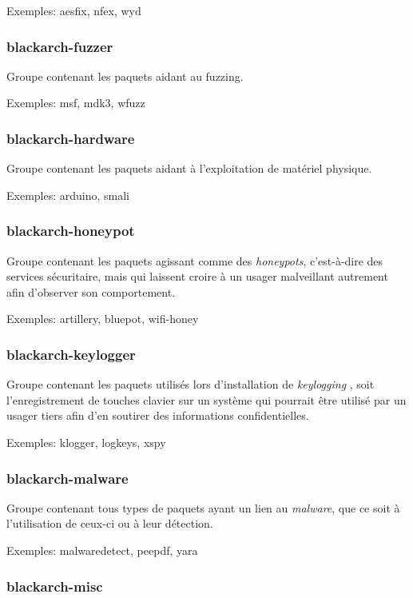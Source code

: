 \documentclass[a4paper, oneside, 11pt]{book}
\begin{document}
Exemples: aesfix, nfex, wyd

\subsubsection{blackarch-fuzzer}

Groupe contenant les paquets aidant au fuzzing. 

Exemples: msf, mdk3, wfuzz

\subsubsection{blackarch-hardware}

Groupe contenant les paquets aidant à l'exploitation de matériel physique.

Exemples: arduino, smali

\subsubsection{blackarch-honeypot}

Groupe contenant les paquets agissant comme des \textit{honeypots}, c'est-à-dire
des services sécuritaire, mais qui laissent croire à un usager malveillant
autrement afin d'observer son comportement.

Exemples: artillery, bluepot, wifi-honey

\subsubsection{blackarch-keylogger}

Groupe contenant les paquets utilisés lors d'installation de \textit{keylogging}
, soit l'enregistrement de touches clavier sur un système qui pourrait être
utilisé par un usager tiers afin d'en soutirer des informations confidentielles.

Exemples: klogger, logkeys, xspy

\subsubsection{blackarch-malware}

Groupe contenant tous types de paquets ayant un lien au \textit{malware}, que ce
soit à l'utilisation de ceux-ci ou à leur détection.

Exemples: malwaredetect, peepdf, yara

\subsubsection{blackarch-misc}
\end{document}
